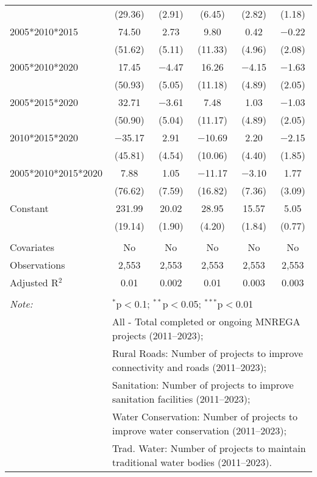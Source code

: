\begin{table}[!htbp]
\begin{tabular}{@{\extracolsep{1pt}}lccccc}
  & (29.36) & (2.91) & (6.45) & (2.82) & (1.18) \\ 
  2005*2010*2015 & 74.50 & 2.73 & 9.80 & 0.42 & $-$0.22 \\ 
  & (51.62) & (5.11) & (11.33) & (4.96) & (2.08) \\ 
  2005*2010*2020 & 17.45 & $-$4.47 & 16.26 & $-$4.15 & $-$1.63 \\ 
  & (50.93) & (5.05) & (11.18) & (4.89) & (2.05) \\ 
  2005*2015*2020 & 32.71 & $-$3.61 & 7.48 & 1.03 & $-$1.03 \\ 
  & (50.90) & (5.04) & (11.17) & (4.89) & (2.05) \\ 
  2010*2015*2020 & $-$35.17 & 2.91 & $-$10.69 & 2.20 & $-$2.15 \\ 
  & (45.81) & (4.54) & (10.06) & (4.40) & (1.85) \\ 
  2005*2010*2015*2020 & 7.88 & 1.05 & $-$11.17 & $-$3.10 & 1.77 \\ 
  & (76.62) & (7.59) & (16.82) & (7.36) & (3.09) \\ 
  Constant & 231.99 & 20.02 & 28.95 & 15.57 & 5.05 \\ 
  & (19.14) & (1.90) & (4.20) & (1.84) & (0.77) \\ 
 \hline \\[-1.8ex] 
Covariates & No & No & No & No & No \\ 
Observations & 2,553 & 2,553 & 2,553 & 2,553 & 2,553 \\ 
Adjusted R$^{2}$ & 0.01 & 0.002 & 0.01 & 0.003 & 0.003 \\ 
\hline 
\hline \\[-1.8ex] 
\textit{Note:}  & \multicolumn{5}{l}{$^{*}$p$<$0.1; $^{**}$p$<$0.05; $^{***}$p$<$0.01} \\ 
 & \multicolumn{5}{l}{All - Total completed or ongoing MNREGA projects (2011--2023);} \\ 
 & \multicolumn{5}{l}{Rural Roads: Number of projects to improve connectivity and roads (2011--2023);} \\ 
 & \multicolumn{5}{l}{Sanitation:  Number of projects to improve sanitation facilities  (2011--2023);} \\ 
 & \multicolumn{5}{l}{Water Conservation: Number of projects to improve water conservation (2011--2023);} \\ 
 & \multicolumn{5}{l}{Trad. Water: Number of projects to maintain traditional water bodies (2011--2023).} \\ 
\end{tabular} 
\end{table} 
